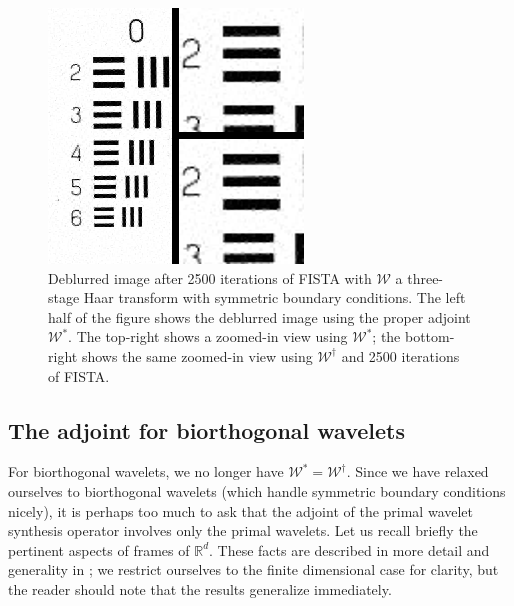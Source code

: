 \documentclass[journal]{IEEEtran}
\newcommand{\reals}{\mathbb{R}}
\begin{document}

\begin{figure}
   \centering
   \includegraphics[width=0.8\columnwidth]{figures/compare_db1_sym_2500.png}
   \caption{Deblurred image after 2500 iterations of FISTA with $\mathcal{W}$ a three-stage Haar transform with symmetric boundary conditions.  The left half of the figure shows the deblurred image using the proper adjoint $\mathcal{W}^\ast$.  The top-right shows a zoomed-in view using $\mathcal{W}^\ast$; the bottom-right shows the same zoomed-in view using $\mathcal{W}^\dagger$ and 2500 iterations of FISTA.}
   \label{fig:compare_db1_sym}
\end{figure}


\subsection{The adjoint for biorthogonal wavelets}
For biorthogonal wavelets, we no longer have $\mathcal{W}^\ast=\mathcal{W}^\dagger$.  Since we have relaxed ourselves to biorthogonal wavelets (which handle symmetric boundary conditions nicely), it is perhaps too much to ask that the adjoint of the primal wavelet synthesis operator involves only the primal wavelets.  Let us recall briefly the pertinent aspects of frames of $\reals^d$.  These facts are described in more detail and generality in \cite{mallat_2009}; we restrict ourselves to the finite dimensional case for clarity, but the reader should note that the results generalize immediately.\\
\end{document}
